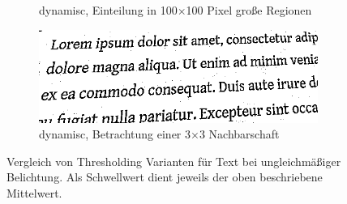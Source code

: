 \begin{figure}[H]
\begin{subfigure}{0.49\linewidth}
    \caption{dynamisc, Einteilung in 100$\times$100 Pixel große Regionen}
  \end{subfigure}
  \begin{subfigure}{0.49\linewidth}
    \centering
    \includegraphics[width=\linewidth]{img/basics/segmentation/dynamic}
    \caption{dynamisc, Betrachtung einer 3$\times$3 Nachbarschaft}
  \end{subfigure}
  \caption[Vergleich von Thresholding Varianten]{Vergleich von Thresholding Varianten für Text bei ungleichmäßiger Belichtung. Als Schwellwert dient jeweils der oben beschriebene Mittelwert.}
\end{figure}
